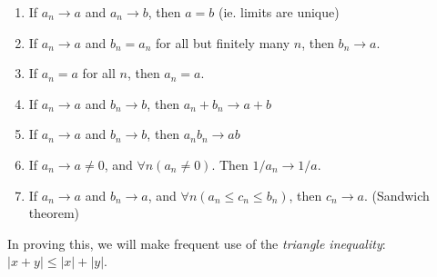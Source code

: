 \documentclass[a4paper]{article}
\begin{document}
\begin{thm}\leavevmode
  \begin{enumerate}
    \item If $a_n\to a$ and $a_n\to b$, then $a = b$ (ie. limits are unique)
    \item If $a_n \to a$ and $b_n = a_n$ for all but finitely many $n$, then $b_n \to a$.
    \item If $a_n = a$ for all $n$, then $a_n = a$.
    \item If $a_n\to a$ and $b_n\to b$, then $a_n + b_n \to a+ b$
    \item If $a_n\to a$ and $b_n \to b$, then $a_nb_n\to ab$
    \item If $a_n\to a\not= 0$, and $\forall n(a_n \not= 0)$. Then $1/a_n \to 1/a$.
    \item If $a_n \to a$ and $b_n \to a$, and $\forall n(a_n\leq c_n\leq b_n)$, then $c_n \to a$. (Sandwich theorem)
  \end{enumerate}
\end{thm}
In proving this, we will make frequent use of the \emph{triangle inequality}: $|x + y|\leq |x| + |y|$.
\end{document}
